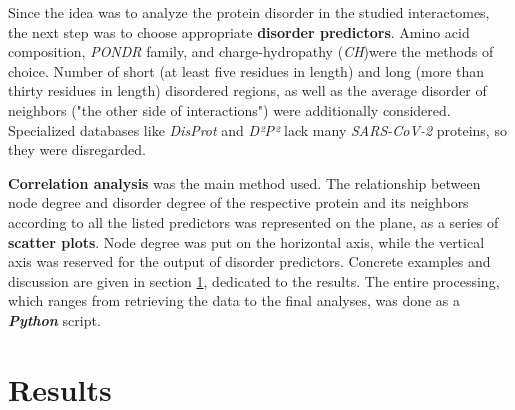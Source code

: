 \documentclass[a4paper]{article}
\begin{document}
Since the idea was to analyze the protein disorder in the studied interactomes, the next step was to choose appropriate \textbf{disorder predictors}. Amino acid composition\footnotemark,  \textit{PONDR}\footnotemark {} family, and charge-hydropathy (\textit{CH})\footnotemark[6] were the methods of choice. Number of short (at least five residues in length) and long (more than thirty residues in length) disordered regions, as well as the average disorder of neighbors ("the other side of interactions") were additionally considered. Specialized databases like \textit{DisProt} and \textit{D²P²} lack many \textit{SARS-CoV-2} proteins, so they were disregarded.

\textbf{Correlation analysis} was the main method used. The relationship between node degree and disorder degree of the respective protein and its neighbors according to all the listed predictors was represented on the plane, as a series of \textbf{scatter plots}. Node degree was put on the horizontal axis, while the vertical axis was reserved for the output of disorder predictors. Concrete examples and discussion are given in section \ref{res}, dedicated to the results. The entire processing, which ranges from retrieving the data to the final analyses, was done as a \textbf{\textit{Python}}\footnotemark {} script.

\section{Results}
\label{res}

\newpage
{}
\appendix
 

\end{document}
